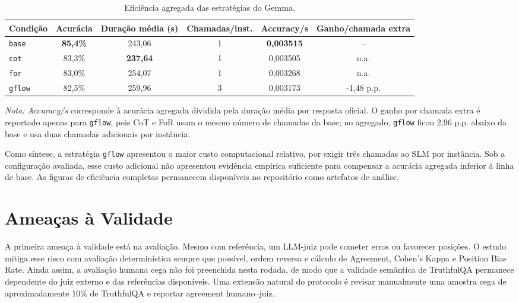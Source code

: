 \documentclass[12pt]{article}
\begin{document}
\begin{table}[H]
\centering
\scriptsize
\setlength{\tabcolsep}{4pt}
\renewcommand{\arraystretch}{1.15}
\caption{Eficiência agregada das estratégias do Gemma.}
\label{tab:eficiencia-gemma}
\begin{tabular}{|p{2.3cm}|c|c|c|c|c|}
\hline
\textbf{Condição} & \textbf{Acurácia} & \textbf{Duração média (s)} & \textbf{Chamadas/inst.} & \textbf{Accuracy/s} & \textbf{Ganho/chamada extra} \\
\hline
\texttt{base} & \textbf{85,4\%} & 243,06 & 1 & \textbf{0,003515} & -- \\
\texttt{cot} & 83,3\% & \textbf{237,64} & 1 & 0,003505 & n.a. \\
\texttt{for} & 83,0\% & 254,07 & 1 & 0,003268 & n.a. \\
\texttt{gflow} & 82,5\% & 259,96 & 3 & 0,003173 & -1,48 p.p. \\
\hline
\end{tabular}
\par\vspace{0.4em}
\begin{minipage}{0.95\textwidth}
\footnotesize\textit{Nota:} \textit{Accuracy/s} corresponde à acurácia agregada dividida pela duração média por resposta oficial. O ganho por chamada extra é reportado apenas para \texttt{gflow}, pois CoT e FoR usam o mesmo número de chamadas da base; no agregado, \texttt{gflow} ficou 2,96 p.p. abaixo da base e usa duas chamadas adicionais por instância.
\end{minipage}
\end{table}


Como s\'intese, a estrat\'egia \texttt{gflow} apresentou o maior custo computacional relativo, por exigir tr\^es chamadas ao SLM por inst\^ancia. Sob a configura\c{c}\~ao avaliada, esse custo adicional n\~ao apresentou evid\^encia emp\'irica suficiente para compensar a acur\'acia agregada inferior \`a linha de base. As figuras de efici\^encia completas permanecem dispon\'iveis no reposit\'orio como artefatos de an\'alise.

\FloatBarrier
\section{Ameaças à Validade}

A primeira ameaça à validade está na avaliação. Mesmo com referência, um LLM-juiz pode cometer erros ou favorecer posições. O estudo mitiga esse risco com avaliação determinística sempre que possível, ordem reversa e cálculo de Agreement, Cohen's Kappa e Position Bias Rate. Ainda assim, a avaliação humana cega não foi preenchida nesta rodada, de modo que a validade semântica de TruthfulQA permanece dependente do juiz externo e das referências disponíveis. Uma extensão natural do protocolo é revisar manualmente uma amostra cega de aproximadamente 10\% de TruthfulQA e reportar agreement humano--juiz.
\end{document}
